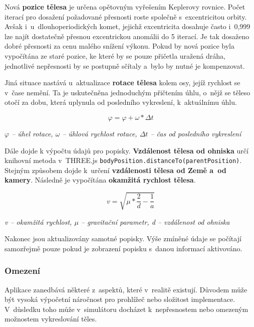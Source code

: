 \documentclass[a4paper,12pt]{article}
\def\code#1{\texttt{#1}}
\begin{document}
Nová \textbf{pozice tělesa} je určena opětovným vyřešením Keplerovy rovnice. Počet iterací pro dosažení požadované přesnosti roste společně s~excentricitou orbity. Avšak i~u~dlouhoperiodických komet, jejichž excentricita dosahuje často i~0,999 lze najít dostatečně přesnou excentrickou anomálii do 5 iterací. Je tak dosaženo dobré přesnosti za cenu malého snížení výkonu. Pokud by nová pozice byla vypočítána ze staré pozice, ke které by se pouze přičetla uražená dráha, jednotlivé nepřesnosti by se postupně sčítaly a~bylo by nutné je kompenzovat. 

Jiná situace nastává u~aktualizace \textbf{rotace tělesa} kolem osy, jejíž rychlost se v~čase nemění. Ta je uskutečněna jednoduchým přičtením úhlu, o~nějž se těleso otočí za dobu, která uplynula od posledního vykreslení, k~aktuálnímu úhlu.

\vspace*{-0.5cm}
$$\varphi = \varphi + \omega * \Delta t$$
\begin{center}
\textit{$\varphi$ -- úhel rotace, $\omega$ -- úhlová rychlost rotace, $\Delta t$ -- čas od posledního vykreslení}
\end{center}

Dále dojde k výpočtu údajů pro popisky. \textbf{Vzdálenost tělesa od ohniska} určí knihovní metoda v~THREE.js \code{bodyPosition.distanceTo(parentPosition)}. Stejným způsobem dojde k~určení \textbf{vzdálenosti tělesa od Země a~od kamery}. Následně je vypočítána \textbf{okamžitá rychlost tělesa}.

\vspace*{-0.5cm}
$$v = \sqrt{\mu * \frac{2}{d} - \frac{1}{a}}$$
\begin{center}
\textit{v -- okamžitá rychlost, $\mu$ -- gravitační parametr, d -- vzdálenost od ohniska}~\cite{kleczek}
\end{center}

Nakonec jsou aktualizovány samotné popisky. Výše zmíněné údaje se počítají samozřejmě pouze pokud je zobrazení popisku s~danou informací aktivováno.

\subsubsection{Omezení}

Aplikace zanedbává některé z~aspektů, které v~realitě existují. Důvodem může být vysoká výpočetní náročnost pro prohlížeč nebo složitost implementace. V~důsledku toho může v~simulátoru docházet k~nepřesnostem nebo omezeným možnostem vykreslování těles.
\end{document}
